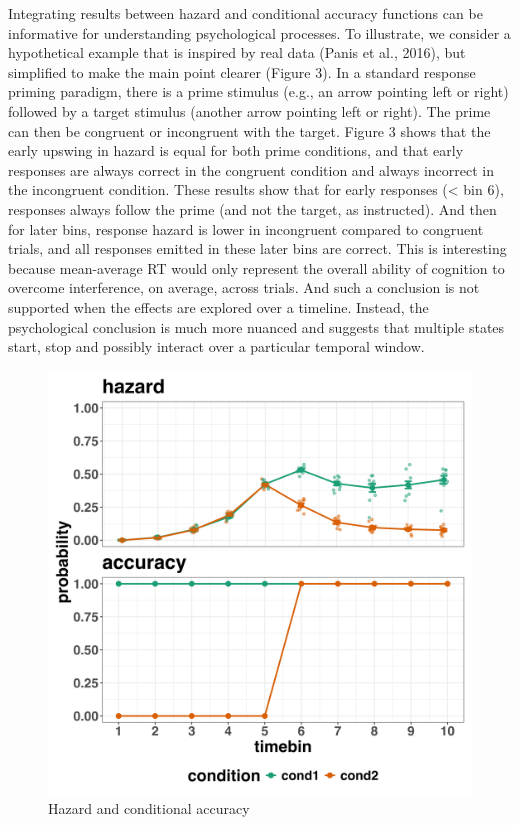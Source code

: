 \documentclass[
  man,floatsintext]{apa6}
\begin{document}
Integrating results between hazard and conditional accuracy functions can be informative for understanding psychological processes. To illustrate, we consider a hypothetical example that is inspired by real data (Panis et al., 2016), but simplified to make the main point clearer (Figure 3). In a standard response priming paradigm, there is a prime stimulus (e.g., an arrow pointing left or right) followed by a target stimulus (another arrow pointing left or right). The prime can then be congruent or incongruent with the target. Figure 3 shows that the early upswing in hazard is equal for both prime conditions, and that early responses are always correct in the congruent condition and always incorrect in the incongruent condition. These results show that for early responses (\textless{} bin 6), responses always follow the prime (and not the target, as instructed). And then for later bins, response hazard is lower in incongruent compared to congruent trials, and all responses emitted in these later bins are correct. This is interesting because mean-average RT would only represent the overall ability of cognition to overcome interference, on average, across trials. And such a conclusion is not supported when the effects are explored over a timeline. Instead, the psychological conclusion is much more nuanced and suggests that multiple states start, stop and possibly interact over a particular temporal window.



\begin{figure}[H]

{\centering \includegraphics[width=0.8\linewidth,height=0.67\textheight,]{../sims/figures/haz_acc} 

}

\caption{Hazard and conditional accuracy}\label{fig:plot3}
\end{figure}
\end{document}
